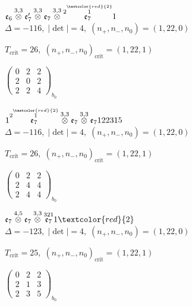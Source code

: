 \documentclass[10pt]{article}
\begin{document}
\smallskip

$\mathfrak{e}_6\overset{3,3}{\otimes}\mathfrak{e}_7'\overset{3,3}{\otimes}\mathfrak{e}_7\overset{3,3}{\otimes}\overset{2\overset{\textcolor{red}{2}}{1}}{\mathfrak{e}_7}1$ \quad $\Delta=-116,\; |\det|=4,\; (n_+,n_-,n_0)=(1,22,0)$

\hspace{1em}$T_{\text{crit}}=26,\; (n_+,n_-,n_0)_{\text{crit}}=(1,22,1)$

\hspace{2em}$\left(\begin{smallmatrix}0 & 2 & 2 \\ 2 & 0 & 2 \\ 2 & 2 & 4\end{smallmatrix}\right)_{\!b_0}$

\smallskip

$1\overset{2\overset{\textcolor{red}{2}}{1}}{\mathfrak{e}_7}\overset{3,3}{\otimes}\mathfrak{e}_7\overset{3,3}{\otimes}\mathfrak{e}_7122315$ \quad $\Delta=-116,\; |\det|=4,\; (n_+,n_-,n_0)=(1,22,0)$

\hspace{1em}$T_{\text{crit}}=26,\; (n_+,n_-,n_0)_{\text{crit}}=(1,22,1)$

\hspace{2em}$\left(\begin{smallmatrix}0 & 2 & 2 \\ 2 & 4 & 4 \\ 2 & 4 & 4\end{smallmatrix}\right)_{\!b_0}$

\smallskip

$\mathfrak{e}_7\overset{4,5}{\otimes}\mathfrak{e}_7\overset{3,3}{\otimes}\overset{321}{\mathfrak{e}_7}1\textcolor{red}{2}$ \quad $\Delta=-123,\; |\det|=4,\; (n_+,n_-,n_0)=(1,22,0)$

\hspace{1em}$T_{\text{crit}}=25,\; (n_+,n_-,n_0)_{\text{crit}}=(1,22,1)$

\hspace{2em}$\left(\begin{smallmatrix}0 & 2 & 2 \\ 2 & 1 & 3 \\ 2 & 3 & 5\end{smallmatrix}\right)_{\!b_0}$
\end{document}
